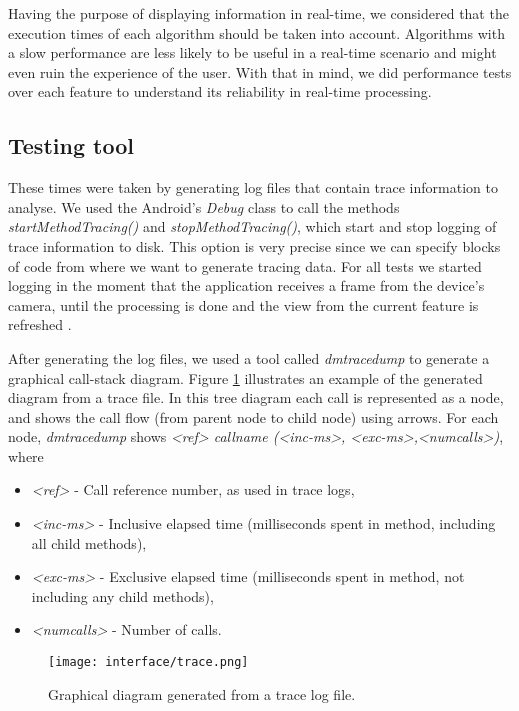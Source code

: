 Having the purpose of displaying information in real-time, we considered that the execution times of each algorithm should be taken into account. Algorithms with a slow performance are less likely to be useful in a real-time scenario and might even ruin the experience of the user. With that in mind, we did performance tests over each feature to understand its reliability in real-time processing.


\subsection{Testing tool}
These times were taken by generating log files that contain trace information to analyse. We used the Android's \emph{Debug} class to call the methods \emph{startMethodTracing()} and \emph{stopMethodTracing()}, which start and stop logging of trace information to disk. This option is very precise since we can specify blocks of code from where we want to generate tracing data. For all tests we started logging in the moment that the application receives a frame from the device's camera, until the processing is done and the view from the current feature is refreshed \cite{SDK}.

After generating the log files, we used a tool called \emph{dmtracedump} to generate a graphical call-stack diagram. Figure \ref{fig:trace_ex} illustrates an example of the generated diagram from a trace file. 
In this tree diagram each call is represented as a node, and shows the call flow (from parent node to child node) using arrows. For each node, \emph{dmtracedump} shows \emph{<ref> callname (<inc-ms>, <exc-ms>,<numcalls>)}, where

\begin{itemize}
\item \emph{<ref>} - Call reference number, as used in trace logs,
\item \emph{<inc-ms>} - Inclusive elapsed time (milliseconds spent in method, including all child methods),
\item \emph{<exc-ms>} - Exclusive elapsed time (milliseconds spent in method, not including any child methods),
\item \emph{<numcalls>} - Number of calls.
\end{itemize}

\begin{figure}[htb]
	\centering
	\texttt{[image: interface/trace.png]}
	\caption{Graphical diagram generated from a trace log file.}
	\label{fig:trace_ex}
\end{figure}

